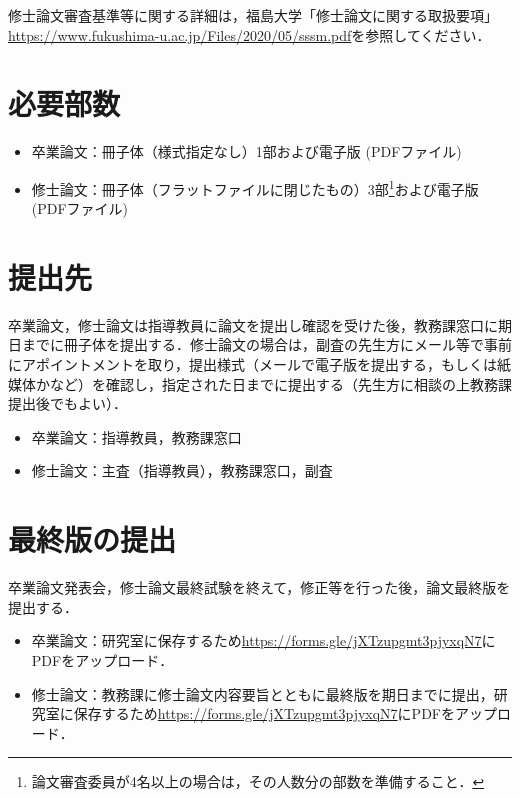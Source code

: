         修士論文審査基準等に関する詳細は，福島大学「修士論文に関する取扱要項」\url{https://www.fukushima-u.ac.jp/Files/2020/05/sssm.pdf}を参照してください．


    \section{必要部数}
        \begin{itemize}
            \item 卒業論文：冊子体（様式指定なし）1部および電子版 (PDFファイル)
            \item 修士論文：冊子体（フラットファイルに閉じたもの）3部\footnote{論文審査委員が4名以上の場合は，その人数分の部数を準備すること．}および電子版 (PDFファイル)
        \end{itemize}

    \section{提出先}
    卒業論文，修士論文は指導教員に論文を提出し確認を受けた後，教務課窓口に期日までに冊子体を提出する．修士論文の場合は，副査の先生方にメール等で事前にアポイントメントを取り，提出様式（メールで電子版を提出する，もしくは紙媒体かなど）を確認し，指定された日までに提出する（先生方に相談の上教務課提出後でもよい）．
        \begin{itemize}
            \item 卒業論文：指導教員，教務課窓口
            \item 修士論文：主査（指導教員），教務課窓口，副査
        \end{itemize}

    \section{最終版の提出}
    卒業論文発表会，修士論文最終試験を終えて，修正等を行った後，論文最終版を提出する．
        \begin{itemize}
            \item 卒業論文：研究室に保存するため\url{https://forms.gle/jXTzupgmt3pjyxqN7}にPDFをアップロード．
            \item 修士論文：教務課に修士論文内容要旨とともに最終版を期日までに提出，研究室に保存するため\url{https://forms.gle/jXTzupgmt3pjyxqN7}にPDFをアップロード．
        \end{itemize}